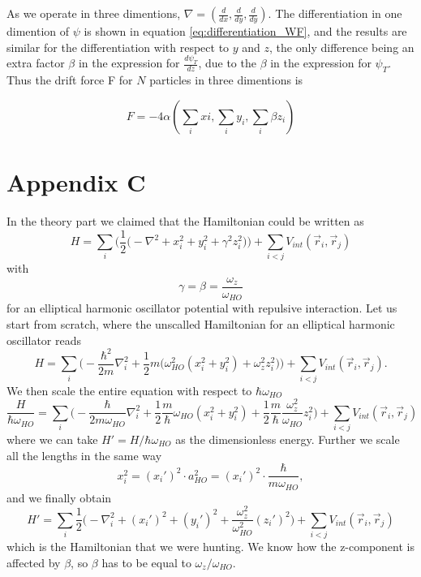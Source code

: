 \documentclass[norsk,a4paper,12pt]{article}
\begin{document}
As we operate in three dimentions, $\nabla = (\frac{d}{dx}, \frac{d}{dy}, \frac{d}{dy})$. The differentiation in one dimention of $\psi$ is shown in equation \ref{eq:differentiation_WF}, and the results are similar for the differentiation with respect to $y$ and $z$, the only difference being an extra factor $\beta$ in the expression for $\frac{d \psi_T}{d z}$, due to the $\beta$ in the expression for $\psi_T$. Thus the drift force F for $N$ particles in three dimentions is 

\begin{equation}
	F = -4 \alpha (\sum_i xi, \sum_i y_i, \sum_i \beta z_i)
\end{equation}

\section*{Appendix C} \label{sec:appendix_c}
In the theory part we claimed that the Hamiltonian could be written as
\begin{equation}
H=\sum_i\bigg(\frac{1}{2}\Big(-\nabla^2 + x_i^2 + y_i^2 + \gamma^2z_i^2\Big)\bigg)+\sum_{i<j}V_{int}(\vec{r}_i,\vec{r}_j)
\end{equation}
with
\begin{equation*}
\gamma=\beta=\frac{\omega_z}{\omega_{HO}}
\end{equation*}
for an elliptical harmonic oscillator potential with repulsive interaction. Let us start from scratch, where the unscalled Hamiltonian for an elliptical harmonic oscillator reads
\begin{equation*}
H=\sum_i\bigg(-\frac{\hbar^2}{2m}\nabla_i^2+\frac{1}{2}m\Big(\omega_{HO}^2(x_i^2+y_i^2)+\omega_z^2z_i^2\Big)\bigg)+\sum_{i<j}V_{int}(\vec{r}_i, \vec{r}_j).
\end{equation*}
We then scale the entire equation with respect to $\hbar\omega_{HO}$
\begin{equation*}
\frac{H}{\hbar\omega_{HO}}=\sum_i\bigg(-\frac{\hbar}{2m\omega_{HO}}\nabla_i^2+\frac{1}{2}\frac{m}{\hbar}\omega_{HO}(x_i^2+y_i^2)+\frac{1}{2}\frac{m}{\hbar}\frac{\omega_z^2}{\omega_{HO}}z_i^2\bigg)+\sum_{i<j}V_{int}(\vec{r}_i, \vec{r}_j)
\end{equation*}
where we can take $H'=H/\hbar\omega_{HO}$ as the dimensionless energy. Further we scale all the lengths in the same way
\begin{equation*}
x_i^2=(x_i')^2\cdot a_{HO}^2=(x_i')^2\cdot\frac{\hbar}{m\omega_{HO}},
\end{equation*}
and we finally obtain
\begin{equation}
H'=\sum_i\frac{1}{2}\bigg(-\nabla_i^2+(x_i')^2+(y_i')^2+\frac{\omega_z^2}{\omega_{HO}^2}(z_i')^2\bigg)+\sum_{i<j}V_{int}(\vec{r}_i, \vec{r}_j)
\end{equation}
which is the Hamiltonian that we were hunting. We know how the z-component is affected by $\beta$, so $\beta$ has to be equal to $\omega_z/\omega_{HO}$.
\end{document}
